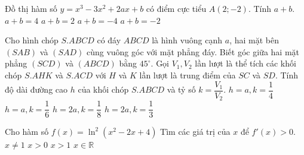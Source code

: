 \begin{ex}%
Đồ thị hàm số $y=x^3-3x^2+2ax+b$ có điểm cực tiểu $A(2;-2)$. Tính $a+b$.
\choice
{$ a+b=4 $}
{\True $ a+b=2 $}
{$ a+b=-4 $}
{$ a+b=-2 $}
\end{ex}

\begin{ex}%
Cho hình chóp $ S. ABCD $ có đáy $ ABCD $ là hình vuông cạnh $a$, hai mặt bên $(SAB)$ và $(SAD)$ cùng vuông góc với mặt phẳng đáy. Biết góc giữa hai mặt phẳng $(SCD)$ và $(ABCD)$ bằng $ 45^\circ $. Gọi $ V_1, V_2 $ lần lượt là thể tích các khối chóp $ S. AHK $ và $ S. ACD $ với $ H $ và $ K $ lần lượt là trung điểm của $ SC $ và $ SD $. Tính độ dài đường cao $ h $ của khối chóp $ S. ABCD $ và tỷ số $ k=\dfrac{V_1}{V_2}$.
\choice
{\True $ h=a, k=\dfrac{1}{4}$}
{$ h=a, k=\dfrac{1}{6}$}
{$ h=2a, k=\dfrac{1}{8}$}
{$ h=2a, k=\dfrac{1}{3}$}
\end{ex}

\begin{ex}%
Cho hàm số $ f(x)=\ln^2(x^2-2x+4)$ Tìm các giá trị của $ x $ để $f'(x)>0 $.
\choice
{$ x\ne 1 $}
{$ x>0 $}
{\True $ x>1 $}
{$ x\in \mathbb{R} $}
\end{ex}

